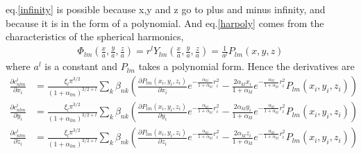 \documentclass[10pt]{article}
\begin{document}
eq.\ref{infinity} is possible because x,y and z go to plus and minus infinity, and because it is in the form of a polynomial. And eq.\ref{harpoly} comes from the characteristics of the spherical harmonics,
\begin{align}
\Phi_{lm}(\frac{x}{a},\frac{y}{a},\frac{z}{a}) = r^l Y_{lm}(\frac{x}{a},\frac{y}{a},\frac{z}{a})  = \frac{1}{a^l} P_{lm}(x,y,z)
\end{align}
where $a^l$ is a constant and $P_{lm}$ takes a polynomial form. Hence the derivatives are
\begin{align}
         \frac{\partial c^i_{nlm}}{ \partial x_i} &=  \frac{\xi_l\pi^{3/2}}{(1+\alpha_{lm})^{3/2 + l}}\sum_k \beta_{nk} \left( \frac{\partial P_{lm}(x_i, y_i, z_i)}{\partial x_i} e^{-\frac{\alpha_{kl}}{1+\alpha_{kl}} r^2_i} - \frac{2\alpha_{kl}x_i}{1+\alpha_{kl} }e^{-\frac{\alpha_{kl}}{1+\alpha_{kl}} r^2_i} P_{lm}(x_i, y_i, z_i)  \right) \\
         \frac{\partial c^i_{nlm}}{ \partial y_i} &=  \frac{\xi_l\pi^{3/2}}{(1+\alpha_{lm})^{3/2 + l}}\sum_k \beta_{nk} \left( \frac{\partial P_{lm}(x_i, y_i, z_i)}{\partial y_i} e^{-\frac{\alpha_{kl}}{1+\alpha_{kl}} r^2_i} - \frac{2\alpha_{kl}y_i}{1+\alpha_{kl} }e^{-\frac{\alpha_{kl}}{1+\alpha_{kl}} r^2_i} P_{lm}(x_i, y_i, z_i)  \right) \\
         \frac{\partial c^i_{nlm}}{ \partial z_i} &=  \frac{\xi_l\pi^{3/2}}{(1+\alpha_{lm})^{3/2 + l}}\sum_k \beta_{nk} \left( \frac{\partial P_{lm}(x_i, y_i, z_i)}{\partial z_i} e^{-\frac{\alpha_{kl}}{1+\alpha_{kl}} r^2_i} - \frac{2\alpha_{kl}z_i}{1+\alpha_{kl} }e^{-\frac{\alpha_{kl}}{1+\alpha_{kl}} r^2_i} P_{lm}(x_i, y_i, z_i)  \right)
\end{align}
\end{document}
